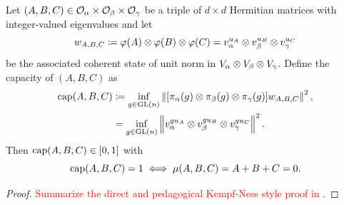\documentclass[notitlepage, 10pt]{article}
\begin{document}
\begin{prop}
    \label{prop:kempf-ness-abc}
    Let $(A,B,C) \in \mathcal O_{\alpha} \times \mathcal O_{\beta} \times \mathcal O_{\gamma}$ be a triple of $d\times d$ Hermitian matrices with integer-valued eigenvalues and let
    \begin{equation}
        w_{A,B,C} \coloneqq \varphi(A) \otimes \varphi(B) \otimes \varphi(C) = v_\alpha^{u_A} \otimes v_\beta^{u_B} \otimes v_\gamma^{u_C}
    \end{equation}
    be the associated coherent state of unit norm in $V_{\alpha} \otimes V_{\beta} \otimes V_{\gamma}$.
    Define the capacity of $(A,B,C)$ as
    \begin{align}
        \operatorname{cap}(A,B,C) 
        &\coloneqq \inf_{g \in \operatorname{GL}(n)} \left\lVert[\pi_{\alpha}(g)\otimes\pi_{\beta}(g)\otimes\pi_{\gamma}(g)] w_{A,B,C}\right\rVert^{2}, \\
        &= \inf_{g \in \operatorname{GL}(n)} \left\lVert v_\alpha^{gu_A} \otimes v_\beta^{gu_B} \otimes v_\gamma^{gu_C}\right\rVert^{2}.
    \end{align}
    Then $\operatorname{cap}(A,B,C) \in [0,1]$ with 
    \begin{equation}
        \operatorname{cap}(A,B,C) = 1 \iff \mu(A,B,C) = A+B+C = 0.
    \end{equation}
\end{prop}
\begin{proof}
    \textcolor{red}{Summarize the direct and pedagogical Kempf-Ness style proof in \cite[Proposition 2.3]{berline2018horn}.} 
\end{proof}
\end{document}
